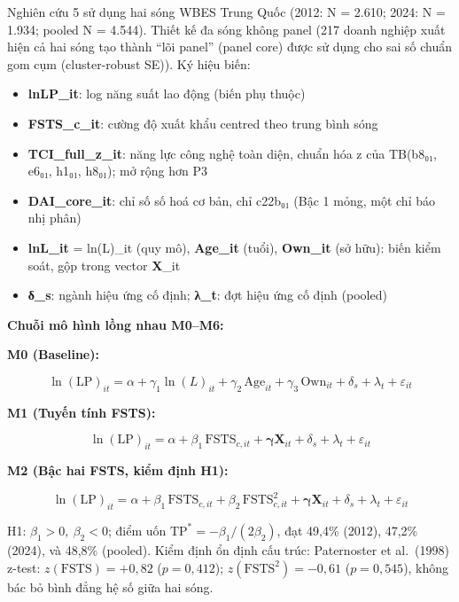 \documentclass[
  a4paper,
  13pt]{extreport}
\providecommand{\tightlist}{%
  \setlength{\itemsep}{0pt}\setlength{\parskip}{0pt}}
\begin{document}
Nghiên cứu 5 sử dụng hai sóng WBES Trung Quốc (2012: N = 2.610; 2024: N
= 1.934; pooled N = 4.544). Thiết kế đa sóng không panel (217 doanh
nghiệp xuất hiện cả hai sóng tạo thành ``lõi panel'' (panel core) được
sử dụng cho sai số chuẩn gom cụm (cluster-robust SE)). Ký hiệu biến:

\begin{itemize}
\tightlist
\item
  \textbf{lnLP\_it}: log năng suất lao động (biến phụ thuộc)
\item
  \textbf{FSTS\_c\_it}: cường độ xuất khẩu centred theo trung bình sóng
\item
  \textbf{TCI\_full\_z\_it}: năng lực công nghệ toàn diện, chuẩn hóa z
  của TB(b8₀₁, e6₀₁, h1₀₁, h8₀₁); mở rộng hơn P3
\item
  \textbf{DAI\_core\_it}: chỉ số số hoá cơ bản, chỉ c22b₀₁ (Bậc 1 mỏng,
  một chỉ báo nhị phân)
\item
  \textbf{lnL\_it} = ln(L)\_it (quy mô), \textbf{Age\_it} (tuổi),
  \textbf{Own\_it} (sở hữu): biến kiểm soát, gộp trong vector
  \textbf{X}\_it
\item
  \textbf{δ\_s}: ngành hiệu ứng cố định; \textbf{λ\_t}: đợt hiệu ứng cố
  định (pooled)
\end{itemize}

\textbf{Chuỗi mô hình lồng nhau M0--M6:}

\textbf{M0 (Baseline):}

\[\ln(\mathrm{LP})_{it} = \alpha + \gamma_1 \ln(L)_{it} + \gamma_2\,\mathrm{Age}_{it} + \gamma_3\,\mathrm{Own}_{it} + \delta_s + \lambda_t + \varepsilon_{it}\]

\textbf{M1 (Tuyến tính FSTS):}

\[\ln(\mathrm{LP})_{it} = \alpha + \beta_1\,\mathrm{FSTS}_{c,it} + \boldsymbol{\gamma}\mathbf{X}_{it} + \delta_s + \lambda_t + \varepsilon_{it}\]

\textbf{M2 (Bậc hai FSTS, kiểm định H1):}

\[\ln(\mathrm{LP})_{it} = \alpha + \beta_1\,\mathrm{FSTS}_{c,it} + \beta_2\,\mathrm{FSTS}_{c,it}^{2} + \boldsymbol{\gamma}\mathbf{X}_{it} + \delta_s + \lambda_t + \varepsilon_{it}\]

H1: \(\beta_1 > 0,\ \beta_2 < 0\); điểm uốn
\(\mathrm{TP}^{*} = -\beta_1/(2\beta_2)\), đạt 49,4\% (2012), 47,2\%
(2024), và 48,8\% (pooled). Kiểm định ổn định cấu trúc: Paternoster et
al.~(1998) z-test: \(z(\mathrm{FSTS}) = +0{,}82\) (\(p = 0{,}412\));
\(z(\mathrm{FSTS}^{2}) = -0{,}61\) (\(p = 0{,}545\)), không bác bỏ bình
đẳng hệ số giữa hai sóng.
\end{document}
